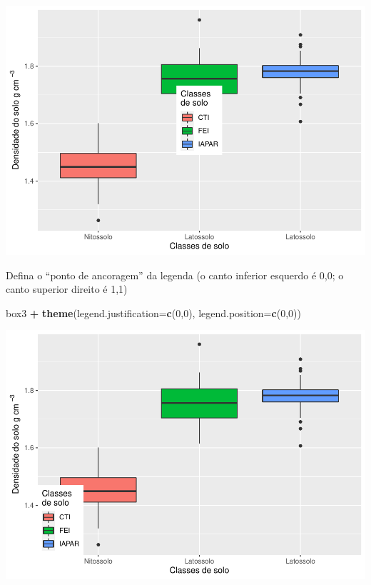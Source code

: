 \documentclass[]{book}
\newenvironment{Shaded}{\begin{snugshade}}{\end{snugshade}}
\newcommand{\DataTypeTok}[1]{\textcolor[rgb]{0.13,0.29,0.53}{#1}}
\newcommand{\DecValTok}[1]{\textcolor[rgb]{0.00,0.00,0.81}{#1}}
\newcommand{\KeywordTok}[1]{\textcolor[rgb]{0.13,0.29,0.53}{\textbf{#1}}}
\newcommand{\NormalTok}[1]{#1}
\newcommand{\OperatorTok}[1]{\textcolor[rgb]{0.81,0.36,0.00}{\textbf{#1}}}
\newcommand{\StringTok}[1]{\textcolor[rgb]{0.31,0.60,0.02}{#1}}
\begin{document}
\includegraphics{TudodoR_files/figure-latex/unnamed-chunk-216-1.pdf}

Defina o ``ponto de ancoragem'' da legenda (o canto inferior esquerdo é 0,0; o canto superior direito é 1,1)

\begin{Shaded}
\begin{Highlighting}[]
\NormalTok{box3 }\OperatorTok{+}\StringTok{ }\KeywordTok{theme}\NormalTok{(}\DataTypeTok{legend.justification=}\KeywordTok{c}\NormalTok{(}\DecValTok{0}\NormalTok{,}\DecValTok{0}\NormalTok{), }\DataTypeTok{legend.position=}\KeywordTok{c}\NormalTok{(}\DecValTok{0}\NormalTok{,}\DecValTok{0}\NormalTok{))}
\end{Highlighting}
\end{Shaded}

\includegraphics{TudodoR_files/figure-latex/unnamed-chunk-217-1.pdf}
\end{document}
